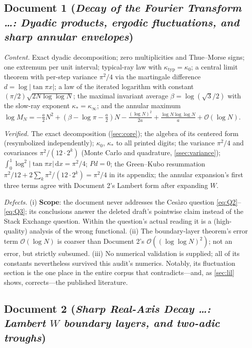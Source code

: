 \documentclass[11pt,oneside]{article}
\theoremstyle{definition}
\theoremstyle{remark}
\newcommand{\dd}{\,\mathrm d}
\newcommand{\bigO}{\mathcal O}
\begin{document}
\subsection{Document 1 (\emph{Decay of the Fourier Transform \dots:
Dyadic products, ergodic fluctuations, and sharp annular envelopes})}

\emph{Content.}  Exact dyadic decomposition; zero multiplicities and
Thue--Morse signs; one extremum per unit interval; typical-ray law with
$\kappa_{\mathrm{typ}}=\kappa_0$; a central limit theorem with per-step
variance $\pi^2/4$ via the martingale difference
$d=\log|\tan\pi x|$; a law of the iterated logarithm with constant
$(\pi/2)\sqrt{2N\log\log N}$; the maximal invariant average
$\beta=\log(\sqrt3/2)$ with the slow-ray exponent
$\kappa_*=\kappa_\infty$; and the annular maximum
$\log M_N=-\tfrac a2N^2+(\beta-\log\pi-\tfrac a2)N
-\frac{(\log N)^2}{2a}+\frac{\log N\log\log N}{a}+\bigO(\log N)$.

\emph{Verified.}  The exact decomposition (\cref{sec:core}); the algebra of
its centered form (resymbolized independently); $\kappa_0$, $\kappa_*$ to
all printed digits; the variance $\pi^2/4$ and covariances
$\pi^2/(12\cdot2^k)$ (Monte Carlo and quadrature,
\cref{ssec:variance}); $\int_0^1\log^2|\tan\pi x|\dd x=\pi^2/4$;
$Pd=0$; the Green--Kubo resummation $\pi^2/12+2\sum_k\pi^2/(12\cdot2^k)
=\pi^2/4$ in its appendix; the annular expansion's first three terms agree
with Document 2's Lambert form after expanding $W$.

\emph{Defects.}
(i) \textbf{Scope}: the document never addresses the Ces\`aro question
\eqref{eq:Q2}--\eqref{eq:Q3}; its conclusions answer the deleted draft's
pointwise claim instead of the Stack Exchange question.  Within the
question's actual reading it is a (high-quality) analysis of the wrong
functional.
(ii) The boundary-layer theorem's error term $\bigO(\log N)$ is coarser
than Document 2's $\bigO((\log\log N)^2)$; not an error, but strictly
subsumed.
(iii) No numerical validation is supplied; all of its constants
nevertheless survived this audit's numerics.  Notably, its fluctuation
section is the one place in the entire corpus that contradicts---and,
as \cref{sec:lil} shows, corrects---the published literature.

\subsection{Document 2 (\emph{Sharp Real-Axis Decay \dots: Lambert $W$
boundary layers, and two-adic troughs})}
\end{document}

